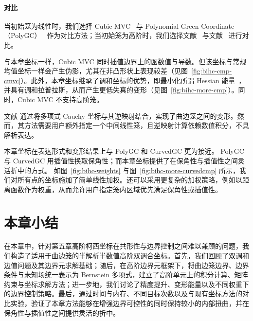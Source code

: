 \paragraph{对比}
当初始笼为线性时，我们选择 Cubic MVC~\cite{Li2013} 与 Polynomial Green Coordinate（PolyGC）~\cite{MichelThiery2023} 作为对比方法；当初始笼为高阶时，我们选择文献~\cite{liu2024polygc} 与文献~\cite{Lin2024PolynomialCC} 进行对比。

与本章坐标一样，Cubic MVC 同时插值边界上的函数值与导数。但该坐标与常规均值坐标一样会产生伪影，尤其在非凸形状上表现较差（见图~\ref{fig:bihc-cmp-cmvc}）。此外，本章坐标继承了调和坐标的优势，即最小化所谓 Hessian 能量~\cite{Stein2018NaturalBC}，并具有调和拉普拉斯，从而产生更低失真的变形（见图~\ref{fig:bihc-more-cmp}）。同时，Cubic MVC 不支持高阶笼。

文献\cite{Lin2024PolynomialCC} 通过将多项式 Cauchy 坐标与其逆映射结合，实现了曲边笼之间的变形。然而，其方法需要用户额外指定一个中间线性笼，且逆映射计算依赖数值积分，不具解析表达。

本章坐标在表达形式和变形结果上与 PolyGC 和 CurvedGC 更为接近。
PolyGC 与 CurvedGC 用插值性换取保角性；而本章坐标提供了在保角性与插值性之间灵活折中的方式。
如图~\ref{fig:bihc-weights} 与图~\ref{fig:bihc-more-curvedcmp} 所示，我们对所有点的坐标施加了简单线性加权。还可以采用更复杂的加权策略，例如以距离函数作为权重，从而允许用户指定笼内区域优先满足保角性或插值性。

\section{本章小结}
在本章中，针对第五章高阶柯西坐标在共形性与边界控制之间难以兼顾的问题，我们构造了适用于曲边笼的半解析半数值高阶双调合坐标。首先，我们回顾了双调和边值问题及其边界元求解基础；随后，在高阶边界元框架下，将曲边笼边界、边界条件与未知场统一表示为 Bernstein 多项式，建立了高阶单元上的积分计算、矩阵约束与坐标求解方法；进一步地，我们讨论了精度提升、变形能量以及不同权重下的边界控制策略。最后，通过时间与内存、不同目标次数以及与现有坐标方法的对比实验，验证了本章方法能够在增强边界可控性的同时保持较小的内部扭曲，并在保角性与插值性之间提供灵活的折中。
